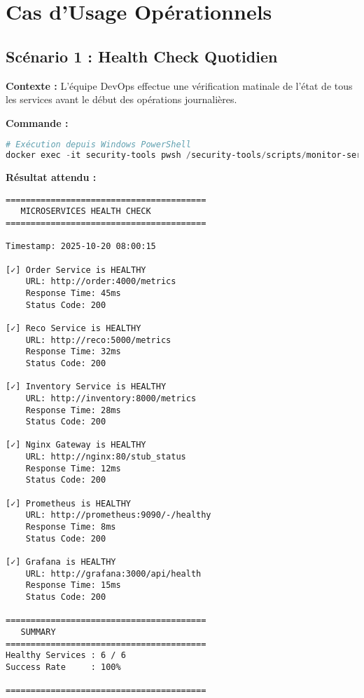 \documentclass[11pt,a4paper]{report}
\begin{document}

\chapter{Cas d'Usage Opérationnels}

\section{Scénario 1 : Health Check Quotidien}

\textbf{Contexte :} L'équipe DevOps effectue une vérification matinale de l'état de tous les services avant le début des opérations journalières.

\textbf{Commande :}
\begin{lstlisting}[language=PowerShell, caption=Commande de Check Quotidien]
# Exécution depuis Windows PowerShell
docker exec -it security-tools pwsh /security-tools/scripts/monitor-services.ps1
\end{lstlisting}

\textbf{Résultat attendu :}
\begin{lstlisting}[basicstyle=\ttfamily\tiny]
========================================
   MICROSERVICES HEALTH CHECK
========================================

Timestamp: 2025-10-20 08:00:15

[✓] Order Service is HEALTHY
    URL: http://order:4000/metrics
    Response Time: 45ms
    Status Code: 200

[✓] Reco Service is HEALTHY
    URL: http://reco:5000/metrics
    Response Time: 32ms
    Status Code: 200

[✓] Inventory Service is HEALTHY
    URL: http://inventory:8000/metrics
    Response Time: 28ms
    Status Code: 200

[✓] Nginx Gateway is HEALTHY
    URL: http://nginx:80/stub_status
    Response Time: 12ms
    Status Code: 200

[✓] Prometheus is HEALTHY
    URL: http://prometheus:9090/-/healthy
    Response Time: 8ms
    Status Code: 200

[✓] Grafana is HEALTHY
    URL: http://grafana:3000/api/health
    Response Time: 15ms
    Status Code: 200

========================================
   SUMMARY
========================================
Healthy Services : 6 / 6
Success Rate     : 100%

========================================
\end{lstlisting}
\end{document}
